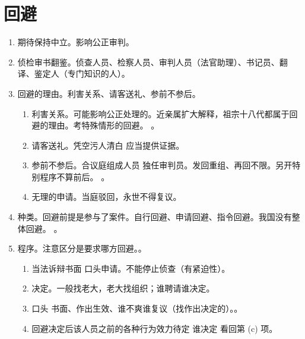 \section{回避}
\begin{enumerate}
  \item 期待保持中立。影响公正审判。
  \item 侦检审书翻鉴。侦查人员、检察人员、审判人员（法官助理）、书记员、翻译、鉴定人（专门知识的人）。
  \item 回避的理由。利害关系、请客送礼、参前不参后。
        \begin{enumerate}
          \item 利害关系。可能影响公正处理的。近亲属扩大解释，祖宗十八代都属于回避的理由。考特殊情形的回避。
                。
          \item 请客送礼。凭空污人清白 \yjt 应当提供证据。
          \item 参前不参后。合议庭组成人员 \hz 独任审判员。发回重组、再回不限。另开特别程序不算前后。
                。
          \item 无理的申请。当庭驳回，永世不得复议。
        \end{enumerate}
  \item 种类。回避前提是参与了案件。自行回避、申请回避、指令回避。我国没有整体回避。
        。
  \item 程序。注意区分是要求哪方回避。。
        \begin{enumerate}
          \item 当法诉辩书面 \hz 口头申请。不能停止侦查（有紧迫性）。
          \item 决定。一般找老大，老大找组织；谁聘请谁决定。
          \item 口头 \hz 书面、作出生效、谁不爽谁复议（找作出决定的）。。
          \item 回避决定后该人员之前的各种行为效力待定 \yjt 谁决定 \yjt 看回第 (c) 项。
        \end{enumerate}
\end{enumerate}
